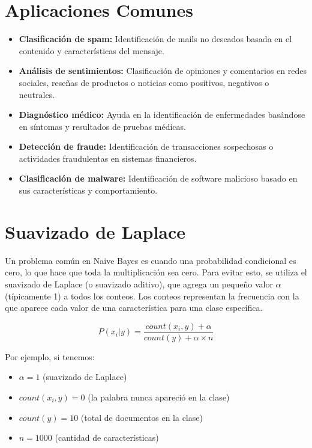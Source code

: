 \documentclass[12pt]{article}
\begin{document}
\section{Aplicaciones Comunes}

\begin{itemize}
    \item \textbf{Clasificación de spam:} Identificación de mails no deseados basada en el contenido y características del mensaje.
    
    \item \textbf{Análisis de sentimientos:} Clasificación de opiniones y comentarios en redes sociales, reseñas de productos o noticias como positivos, negativos o neutrales.
    
    \item \textbf{Diagnóstico médico:} Ayuda en la identificación de enfermedades basándose en síntomas y resultados de pruebas médicas.
    
    \item \textbf{Detección de fraude:} Identificación de transacciones sospechosas o actividades fraudulentas en sistemas financieros.
    
    \item \textbf{Clasificación de malware:} Identificación de software malicioso basado en sus características y comportamiento.
\end{itemize}

\section{Suavizado de Laplace}
Un problema común en Naive Bayes es cuando una probabilidad condicional es cero, lo que hace que toda la multiplicación sea cero. Para evitar esto, se utiliza el suavizado de Laplace (o suavizado aditivo), que agrega un pequeño valor $\alpha$ (típicamente 1) a todos los conteos. Los conteos representan la frecuencia con la que aparece cada valor de una característica para una clase específica.

\[
P(x_i|y) = \frac{count(x_i, y) + \alpha}{count(y) + \alpha \times n}
\]

Por ejemplo, si tenemos:
\begin{itemize}
    \item $\alpha = 1$ (suavizado de Laplace)
    \item $count(x_i, y) = 0$ (la palabra nunca apareció en la clase)
    \item $count(y) = 10$ (total de documentos en la clase)
    \item $n = 1000$ (cantidad de características)
\end{itemize}
\end{document}
